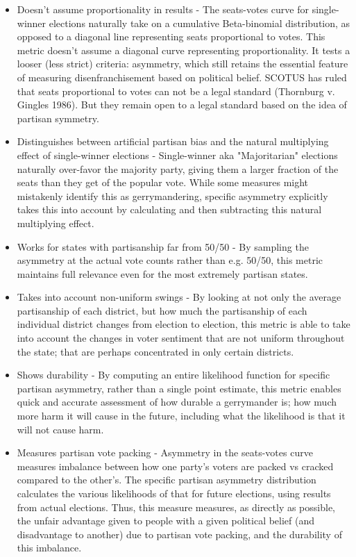 \documentclass[preprint,12pt]{article}
\begin{document}
\begin{itemize}

\item Doesn't assume proportionality in results - The seats-votes curve for single-winner elections naturally take on a cumulative Beta-binomial distribution, as opposed to a diagonal line representing seats proportional to votes.  This metric doesn't assume a diagonal curve representing proportionality.  It tests a looser (less strict) criteria: asymmetry, which still retains the essential feature of measuring disenfranchisement based on political belief.  SCOTUS has ruled that seats proportional to votes can not be a legal standard (Thornburg v. Gingles 1986).   But they remain open to a legal standard based on the idea of partisan symmetry.
 
\item Distinguishes between artificial partisan bias and the natural multiplying effect of single-winner elections -  Single-winner aka "Majoritarian" elections naturally over-favor the majority party, giving them a larger fraction of the seats than they get of the popular vote.  While some measures might mistakenly identify this as gerrymandering, specific asymmetry explicitly takes this into account by calculating and then subtracting this natural multiplying effect.
 
\item Works for states with partisanship far from 50/50 - By sampling the asymmetry at the actual vote counts rather than e.g. 50/50, this metric maintains full relevance even for the most extremely partisan states.
 
\item Takes into account non-uniform swings - By looking at not only the average partisanship of each district, but how much the partisanship of each individual district changes from election to election, this metric is able to take into account the changes in voter sentiment that are not uniform throughout the state; that are perhaps concentrated in only certain districts.

\item Shows durability - By computing an entire likelihood function for specific partisan asymmetry, rather than a single point estimate, this metric enables quick and accurate assessment of how durable a gerrymander is; how much more harm it will cause in the future, including what the likelihood is that it will not cause harm.
 
\item Measures partisan vote packing - Asymmetry in the seats-votes curve measures imbalance between how one party's voters are packed vs cracked compared to the other's. The specific partisan asymmetry distribution calculates the various likelihoods of that for future elections, using results from actual elections.  Thus, this measure measures, as directly as possible, the unfair advantage given to people with a given political belief (and disadvantage to another) due to partisan vote packing, and the durability of this imbalance.


\end{itemize}
\end{document}
